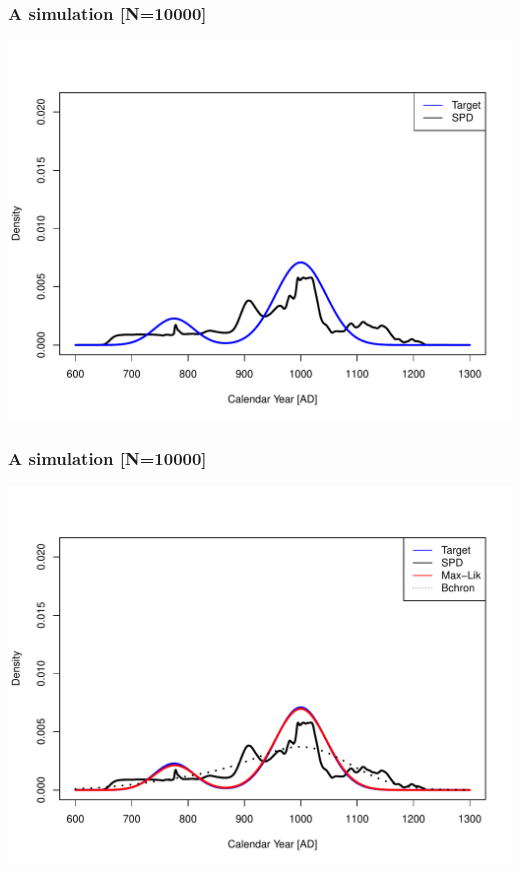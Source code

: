 \documentclass{beamer}
\begin{document}
\begin{frame}[t]
  \frametitle{A simulation [N=10000]}
    \includegraphics[height=.85\textheight]{sim_target_spd_10000.pdf}
\end{frame}

\begin{frame}[t]
  \frametitle{A simulation [N=10000]}
    \includegraphics[height=.85\textheight]{sim_target_spd_max-lik_bchron_10000.pdf}
\end{frame}
\end{document}
